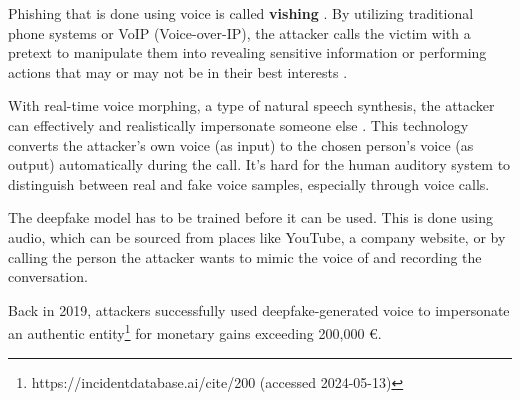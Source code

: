 Phishing that is done using voice is called \textbf{vishing} \citep{salahdineSocialEngineeringAttacks2019}. By utilizing traditional phone systems or VoIP (Voice-over-IP), the attacker calls the victim with a pretext to manipulate them into revealing sensitive information or performing actions that may or may not be in their best interests \citep{hadnagySocialEngineering2018}.



With real-time voice morphing, a type of natural speech synthesis, the attacker can effectively and realistically impersonate someone else \citep{doanBTSEAudioDeepfakeDetectiong2023}. This technology converts the attacker's own voice (as input) to the chosen person's voice (as output) automatically during the call. It's hard for the human auditory system to distinguish between real and fake voice samples, especially through voice calls.

The deepfake model has to be trained before it can be used. This is done using audio, which can be sourced from places like YouTube, a company website, or by calling the person the attacker wants to mimic the voice of and recording the conversation.


Back in 2019, attackers successfully used deepfake-generated voice to impersonate an authentic entity\footnote{https://incidentdatabase.ai/cite/200 (accessed 2024-05-13)} for monetary gains exceeding 200,000 €.